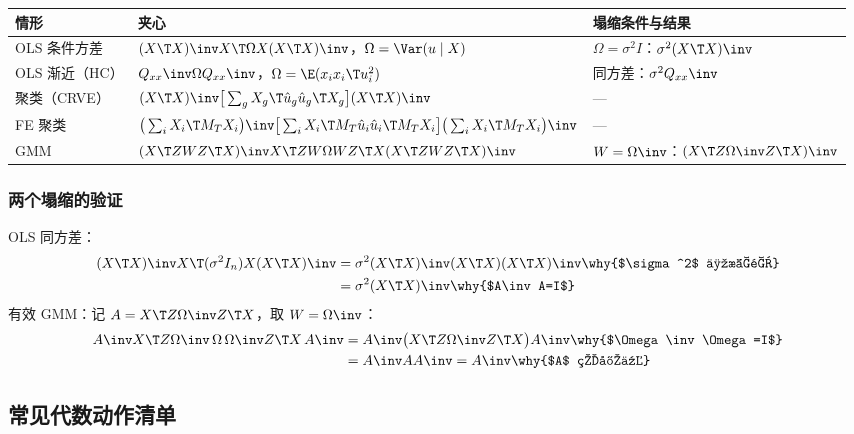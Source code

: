 \begin{center}\begin{minipage}{\linewidth}\centering
\small
\begin{tabularx}{\linewidth}{lLl}
\toprule
情形 & 夹心 & 塌缩条件与结果\\
\midrule
OLS 条件方差 & $(X\T X)\inv X\T\Omega X(X\T X)\inv$，$\Omega=\Var(u\mid X)$ & $\Omega=\sigma^2I$：$\sigma^2(X\T X)\inv$\\
OLS 渐近（HC） & $Q_{xx}\inv\Omega Q_{xx}\inv$，$\Omega=\E(x_ix_i\T u_i^2)$ & 同方差：$\sigma^2Q_{xx}\inv$\\
聚类（CRVE） & $(X\T X)\inv\big[\sum_gX_g\T\hat u_g\hat u_g\T X_g\big](X\T X)\inv$ & —\\
FE 聚类 & $\big(\sum_iX_i\T M_TX_i\big)\inv\big[\sum_iX_i\T M_T\hat u_i\hat u_i\T M_TX_i\big]\big(\sum_iX_i\T M_TX_i\big)\inv$ & —\\
GMM & $(X\T ZWZ\T X)\inv X\T ZW\Omega WZ\T X(X\T ZWZ\T X)\inv$ & $W=\Omega\inv$：$(X\T Z\Omega\inv Z\T X)\inv$\\
\bottomrule
\end{tabularx}
\end{minipage}\end{center}

\subsubsection{两个塌缩的验证}

OLS 同方差：
\begin{align*}
(X\T X)\inv X\T(\sigma^2I_n)X(X\T X)\inv &= \sigma^2(X\T X)\inv(X\T X)(X\T X)\inv \why{$\sigma^2$ 为标量}\\
&= \sigma^2(X\T X)\inv \why{$A\inv A=I$}
\end{align*}
有效 GMM：记 $A=X\T Z\Omega\inv Z\T X$，取 $W=\Omega\inv$：
\begin{align*}
A\inv X\T Z\Omega\inv\,\Omega\,\Omega\inv Z\T X\,A\inv &= A\inv\big(X\T Z\Omega\inv Z\T X\big)A\inv \why{$\Omega\inv\Omega=I$}\\
&= A\inv AA\inv=A\inv \why{$A$ 的定义}
\end{align*}

\subsection{常见代数动作清单}

